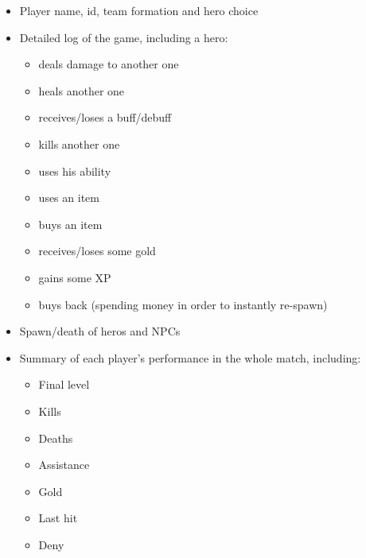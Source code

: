 \documentclass{article}
\begin{document}
\begin{itemize}
	\item Player name, id, team formation and hero choice
	\item Detailed log of the game, including a hero:
	\begin{itemize}
		\item deals damage to another one
		\item heals another one
		\item receives/loses a buff/debuff
		\item kills another one
		\item uses his ability
		\item uses an item
		\item buys an item
		\item receives/loses some gold
		\item gains some XP
		\item buys back (spending money in order to instantly re-spawn)
	\end{itemize}
	\item Spawn/death of heros and NPCs
	\item Summary of each player's performance in the whole match, including:
	\begin{itemize}
		\item Final level
		\item Kills
		\item Deaths
		\item Assistance
		\item Gold
		\item Last hit
		\item Deny
	\end{itemize}
\end{itemize}





\end{document}
